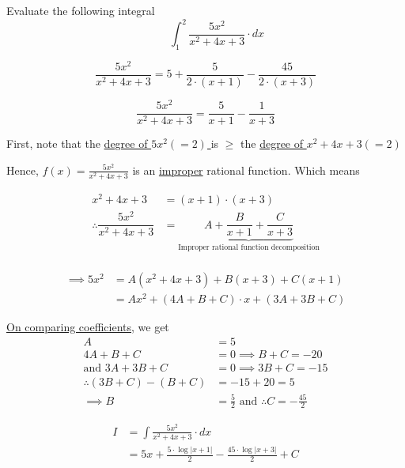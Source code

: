 \documentclass[14pt,fleqn]{extarticle}
\begin{document}
    Evaluate the following integral
    \[ \qquad \int_1^2\dfrac{5x^2}{x^2+4x+3}\cdot dx  \]
    

\newcard 

\[ \frac{5x^2}{x^2 + 4x + 3} = 5 + \frac{5}{2\cdot (x+1)} - \frac{45}{2\cdot (x+3)}\]

\newcard 

\[ \frac{5x^2}{x^2 + 4x + 3} = \frac{5}{x+1} - \frac{1}{x+3}\]

\newcard

First, note that the \underline{degree of $5x^2 (=2)$ } is 
$\geq$ the \underline{degree of $x^2 + 4x + 3 (=2)$} \newline 


Hence, $f(x) = \frac{5x^2}{x^2 + 4x + 3}$ is an \underline{improper} rational function. Which means 

\begin{align}
        x^2+4x+3 &= (x+1)\cdot (x+3) \\
        \therefore \dfrac{5x^2}{x^2+4x+3} &= \underbrace{A 
        + \dfrac{B}{x+1} + \dfrac{C}{x+3}}_{\text{Improper rational function decomposition}}
      \end{align} \\
      \begin{align}
        \implies 5x^2 &= A(x^2+4x+3) + B(x+3) 
        + C(x+1) \\
        &= Ax^2 + (4A + B + C)\cdot x + (3A+3B+C) 
      \end{align}
      
      
      
\underline{On comparing coefficients}, we get 
\begin{align}
	A &= 5 \\
	4A + B + C &= 0 \implies B + C = -20 \\
	\text{and }3A+3B+C &= 0 \implies 3B + C = -15 \\
	\therefore (3B+C) - (B+C) &= -15 + 20 = 5 \\
	\implies B &= \frac{5}{2}\text{ and } \therefore C = -\frac{45}{2} 
\end{align} 

\newcard

\begin{align}
I &= \int \frac{5x^2}{x^2+4x+3}\cdot dx \\
&= 5x + \frac{5\cdot\log\vert x+1\vert}{2} - \frac{45\cdot \log\vert x+3\vert}{2} + C 	
\end{align}


\newcard 
\end{document}
